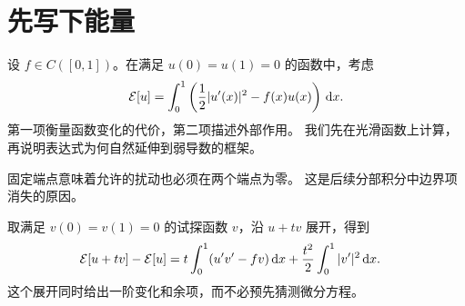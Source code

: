 \section{先写下能量}
\label{sec:energy}
设 $f\in C([0,1])$。在满足 $u(0)=u(1)=0$ 的函数中，考虑
\begin{equation}
  \mathcal{E}[u]=\int_0^1\left(\frac12 |u'(x)|^2-f(x)u(x)\right)\,\mathrm{d}x.
  \label{eq:energy}
\end{equation}
第一项衡量函数变化的代价，第二项描述外部作用。
我们先在光滑函数上计算，再说明表达式为何自然延伸到弱导数的框架。

\begin{observation}
固定端点意味着允许的扰动也必须在两个端点为零。
这是后续分部积分中边界项消失的原因。
\end{observation}

取满足 $v(0)=v(1)=0$ 的试探函数 $v$，沿 $u+tv$ 展开，得到
\begin{align*}
  \mathcal{E}[u+tv]-\mathcal{E}[u]
    &=t\int_0^1(u'v'-fv)\,\mathrm{d}x
      +\frac{t^2}{2}\int_0^1|v'|^2\,\mathrm{d}x.
\end{align*}
这个展开同时给出一阶变化和余项，而不必预先猜测微分方程。
